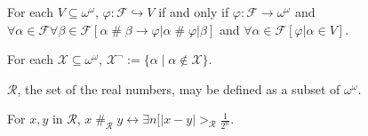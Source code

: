 \documentclass[a4paper]{amsart}
\theoremstyle{plain}
\begin{document}
\smallskip
For each $V\subseteq\omega^\omega$, $\varphi:\mathcal{F}\hookrightarrow V$ if and only if $\varphi:\mathcal{F}\rightarrow \omega^\omega$ and \\$\forall \alpha \in \mathcal{F}\forall \beta\in\mathcal{F}[\alpha\;\#\;\beta\rightarrow \varphi|\alpha\;\#\;\varphi|\beta]$ and $\forall \alpha \in \mathcal{F}[\varphi|\alpha \in V]$.



\smallskip For each $\mathcal{X}\subseteq \omega^\omega$, $\mathcal{X}^\neg:=\{\alpha\mid\alpha\notin\mathcal{X}\}$. 

\smallskip $\mathcal{R}$, the set of the real numbers, may be defined as a subset of $\omega^\omega$. 

\smallskip For $x,y$ in $\mathcal{R}$, $x\;\#_\mathcal{R}\;y\leftrightarrow \exists n[|x-y|>_\mathcal{R} \frac{1}{2^n}$. 
\end{document}
